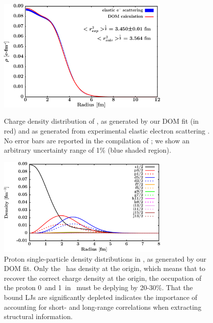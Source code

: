 \begin{figure}[tb]
    \centering
    \includegraphics[width=0.75\textwidth]{figures/ca40_chargeDensity.png}
    \caption[Proton single-particle density distributions in \caForty]
    {
        Charge density distribution of \caForty, as generated
        by our DOM fit (in red) and as generated from experimental
        elastic electron scattering \cite{DeVries1987}. No error bars are
        reported in the compilation of \cite{DeVries1987}; we show an
        arbitrary uncertainty range of 1\% (blue shaded region).
    }
    \label{Ca40ChargeDensity}
    \vspace{16pt}
    \includegraphics[width=0.75\textwidth]{figures/ca40_protonLJDensityDist.png}
    \caption[Proton single-particle density distributions in \caForty]
    {
        Proton single-particle density distributions in \caForty, as generated
        by our DOM fit. Only the \sOne\ has density at the origin, which
        means that to recover the correct charge density at the origin, the
        occupation of the proton 0\sOne\ and 1\sOne\ in \caForty\ must be
        deplying by 20-30\%. That the bound LJs are significantly
        depleted indicates the importance of
        accounting for short- and long-range correlations when extracting
        structural information.
    }
    \label{s1Depletion}
    \label{Ca40ChargeAndLJDensities}
\end{figure}

